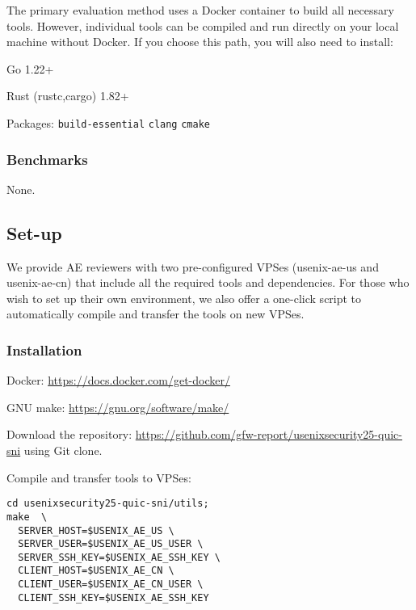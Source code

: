 The primary evaluation method uses a Docker container to
build all necessary tools. However, individual tools
can be compiled and run directly on your local machine
without Docker. If you choose this path,
you will also need to install:
\begin{compactitem}
    \item Go 1.22+
    \item Rust (rustc,cargo) 1.82+
    \item Packages: \texttt{build-essential} \texttt{clang} \texttt{cmake}
\end{compactitem}

\subsubsection{Benchmarks}
None.

\subsection{Set-up}

We provide AE reviewers with two pre-configured VPSes (usenix-ae-us and usenix-ae-cn)
that include all the required tools and dependencies.
For those who wish to set up their own environment,
we also offer a one-click script to automatically
compile and transfer the tools on new VPSes.


\subsubsection{Installation}

\begin{compactitem}
    \item Docker: \url{https://docs.docker.com/get-docker/}
    \item GNU make: \url{https://gnu.org/software/make/}
    \item Download the repository: \url{https://github.com/gfw-report/usenixsecurity25-quic-sni} using Git clone.
    \item Compile and transfer tools to VPSes:
\begin{verbatim}
cd usenixsecurity25-quic-sni/utils;
make  \
  SERVER_HOST=$USENIX_AE_US \
  SERVER_USER=$USENIX_AE_US_USER \
  SERVER_SSH_KEY=$USENIX_AE_SSH_KEY \
  CLIENT_HOST=$USENIX_AE_CN \
  CLIENT_USER=$USENIX_AE_CN_USER \
  CLIENT_SSH_KEY=$USENIX_AE_SSH_KEY

\end{verbatim}
\end{compactitem}

